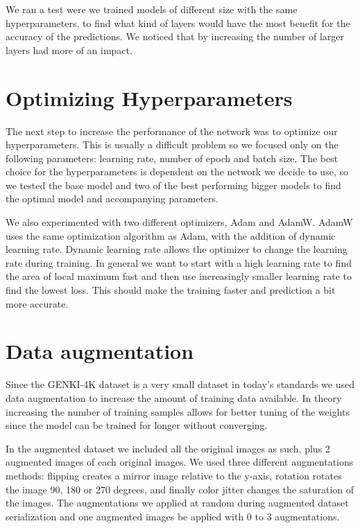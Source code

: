 \documentclass[12pt,a4paper,english
]{tunithesis}
\begin{document}
We ran a test were we trained models of different size with the same hyperparameters, to find what kind of layers would have the most benefit for the accuracy of the predictions. We noticed that by increasing the number of larger layers had more of an impact.

\section{Optimizing Hyperparameters}
The next step to increase the performance of the network was to optimize our hyperparameters. This is usually a difficult problem so we focused only on the following parameters: learning rate, number of epoch and batch size. The best choice for the hyperparameters is dependent on the network we decide to use, so we tested the base model and two of the best performing bigger models to find the optimal model and accompanying parameters.

We also experimented with two different optimizers, Adam and AdamW. AdamW uses the same optimization algorithm as Adam, with the addition of dynamic learning rate. Dynamic learning rate allows the optimizer to change the learning rate during training. In general we want to start with a high learning rate to find the area of local maximum fast and then use increasingly smaller learning rate to find the lowest loss. This should make the training faster and prediction a bit more accurate.~\cite{adamw}

\section{Data augmentation}
\label{sec:dataaug}
Since the GENKI-4K dataset is a very small dataset in today's standards we used data augmentation to increase the amount of training data available. In theory increasing the number of training samples allows for better tuning of the weights since the model can be trained for longer without converging.\cite{dlbook}

In the augmented dataset we included all the original images as such, plus 2 augmented images of each original images. We used three different augmentations methods: flipping creates a mirror image relative to the y-axis, rotation rotates the image 90, 180 or 270 degrees, and finally color jitter changes the saturation of the images. The augmentations we applied at random during augmented dataset serialization and one augmented images be applied with 0 to 3 augmentations.
\end{document}
